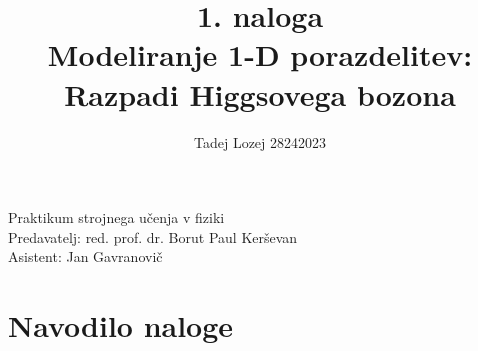 \documentclass[slovene,11pt,a4paper]{article}
\begin{document}
\title{1. naloga \\ Modeliranje 1-D porazdelitev: Razpadi Higgsovega bozona}
\author{Tadej Lozej 28242023}
\maketitle

\begin{center}
Praktikum strojnega učenja v fiziki \\
\bigskip
Predavatelj: red. prof. dr. Borut Paul Kerševan \\
Asistent: Jan Gavranovič
\end{center}

\newpage

\tableofcontents

\newpage


\section{Navodilo naloge}
\end{document}
